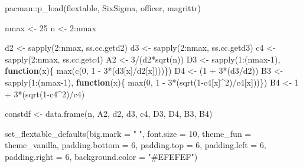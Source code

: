 \documentclass[
]{book}
\newenvironment{Shaded}{\begin{snugshade}}{\end{snugshade}}
\newcommand{\AttributeTok}[1]{\textcolor[rgb]{0.77,0.63,0.00}{#1}}
\newcommand{\ControlFlowTok}[1]{\textcolor[rgb]{0.13,0.29,0.53}{\textbf{#1}}}
\newcommand{\DecValTok}[1]{\textcolor[rgb]{0.00,0.00,0.81}{#1}}
\newcommand{\FunctionTok}[1]{\textcolor[rgb]{0.00,0.00,0.00}{#1}}
\newcommand{\NormalTok}[1]{#1}
\newcommand{\OtherTok}[1]{\textcolor[rgb]{0.56,0.35,0.01}{#1}}
\newcommand{\SpecialCharTok}[1]{\textcolor[rgb]{0.00,0.00,0.00}{#1}}
\newcommand{\StringTok}[1]{\textcolor[rgb]{0.31,0.60,0.02}{#1}}
\begin{document}
\begin{Shaded}
\begin{Highlighting}[]
\NormalTok{pacman}\SpecialCharTok{::}\FunctionTok{p\_load}\NormalTok{(flextable, SixSigma, officer, magrittr)}

\NormalTok{nmax }\OtherTok{\textless{}{-}} \DecValTok{25}
\NormalTok{n }\OtherTok{\textless{}{-}} \DecValTok{2}\SpecialCharTok{:}\NormalTok{nmax}

\NormalTok{d2 }\OtherTok{\textless{}{-}} \FunctionTok{sapply}\NormalTok{(}\DecValTok{2}\SpecialCharTok{:}\NormalTok{nmax, ss.cc.getd2)}
\NormalTok{d3 }\OtherTok{\textless{}{-}} \FunctionTok{sapply}\NormalTok{(}\DecValTok{2}\SpecialCharTok{:}\NormalTok{nmax, ss.cc.getd3)}
\NormalTok{c4 }\OtherTok{\textless{}{-}} \FunctionTok{sapply}\NormalTok{(}\DecValTok{2}\SpecialCharTok{:}\NormalTok{nmax, ss.cc.getc4)}
\NormalTok{A2 }\OtherTok{\textless{}{-}} \DecValTok{3}\SpecialCharTok{/}\NormalTok{(d2}\SpecialCharTok{*}\FunctionTok{sqrt}\NormalTok{(n))}
\NormalTok{D3 }\OtherTok{\textless{}{-}} \FunctionTok{sapply}\NormalTok{(}\DecValTok{1}\SpecialCharTok{:}\NormalTok{(nmax}\DecValTok{{-}1}\NormalTok{), }\ControlFlowTok{function}\NormalTok{(x)\{}
\FunctionTok{max}\NormalTok{(}\FunctionTok{c}\NormalTok{(}\DecValTok{0}\NormalTok{, }\DecValTok{1} \SpecialCharTok{{-}} \DecValTok{3}\SpecialCharTok{*}\NormalTok{(d3[x]}\SpecialCharTok{/}\NormalTok{d2[x])))\})}
\NormalTok{D4 }\OtherTok{\textless{}{-}}\NormalTok{ (}\DecValTok{1} \SpecialCharTok{+} \DecValTok{3}\SpecialCharTok{*}\NormalTok{(d3}\SpecialCharTok{/}\NormalTok{d2))}
\NormalTok{B3 }\OtherTok{\textless{}{-}} \FunctionTok{sapply}\NormalTok{(}\DecValTok{1}\SpecialCharTok{:}\NormalTok{(nmax}\DecValTok{{-}1}\NormalTok{), }\ControlFlowTok{function}\NormalTok{(x)\{}
\FunctionTok{max}\NormalTok{(}\DecValTok{0}\NormalTok{, }\DecValTok{1} \SpecialCharTok{{-}} \DecValTok{3}\SpecialCharTok{*}\NormalTok{(}\FunctionTok{sqrt}\NormalTok{(}\DecValTok{1}\SpecialCharTok{{-}}\NormalTok{c4[x]}\SpecialCharTok{\^{}}\DecValTok{2}\NormalTok{)}\SpecialCharTok{/}\NormalTok{c4[x]))\})}
\NormalTok{B4 }\OtherTok{\textless{}{-}} \DecValTok{1} \SpecialCharTok{+} \DecValTok{3}\SpecialCharTok{*}\NormalTok{(}\FunctionTok{sqrt}\NormalTok{(}\DecValTok{1}\SpecialCharTok{{-}}\NormalTok{c4}\SpecialCharTok{\^{}}\DecValTok{2}\NormalTok{)}\SpecialCharTok{/}\NormalTok{c4)}

\NormalTok{constdf }\OtherTok{\textless{}{-}} \FunctionTok{data.frame}\NormalTok{(n, A2, d2, d3, c4, }
\NormalTok{D3, D4, B3, B4)}

\FunctionTok{set\_flextable\_defaults}\NormalTok{(}\AttributeTok{big.mark =} \StringTok{" "}\NormalTok{, }
  \AttributeTok{font.size =} \DecValTok{10}\NormalTok{, }
  \AttributeTok{theme\_fun =}\NormalTok{ theme\_vanilla,}
  \AttributeTok{padding.bottom =} \DecValTok{6}\NormalTok{, }
  \AttributeTok{padding.top =} \DecValTok{6}\NormalTok{,}
  \AttributeTok{padding.left =} \DecValTok{6}\NormalTok{,}
  \AttributeTok{padding.right =} \DecValTok{6}\NormalTok{,}
  \AttributeTok{background.color =} \StringTok{"\#EFEFEF"}\NormalTok{)}


\end{Highlighting}
\end{Shaded}
\end{document}
